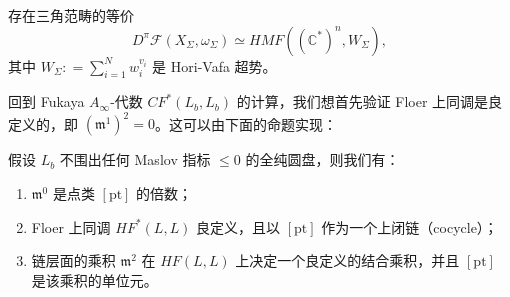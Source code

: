 
\begin{statement*}
存在三角范畴的等价
\[
  D^{\pi}\mathcal{F} (X_{\Sigma},\omega_{\Sigma})\simeq HMF(\left(\mathbb{C}^{\ast}\right)^n,W_{\Sigma}),
\]
其中 $W_{\Sigma}\colon =\sum_{i=1}^N w_i^{v_i}$ 是 Hori-Vafa 超势。
\end{statement*}


回到 Fukaya $A_{\infty}$-代数 $CF^{\ast}(L_b,L_b)$ 的计算，我们想首先验证 Floer 上同调是良定义的，即 $\left(\mathfrak{m}^1\right)^2=0$。这可以由下面的命题实现：

\begin{proposition*}
假设 $L_b$ 不围出任何 Maslov 指标 $\leq 0$ 的全纯圆盘，则我们有：
\begin{enumerate}[leftmargin=1.9em,itemsep=1pt,topsep=2pt]
  \item $\mathfrak{m}^0$ 是点类 $[\mathrm{pt}]$ 的倍数；
  \item Floer 上同调 $HF^{\ast} (L,L)$ 良定义，且以 $[\mathrm{pt}]$ 作为一个上闭链（cocycle）；
  \item 链层面的乘积 $\mathfrak{m}^2$ 在 $HF(L,L)$ 上决定一个良定义的结合乘积，并且 $[\mathrm{pt}]$ 是该乘积的单位元。
\end{enumerate}
\end{proposition*}

